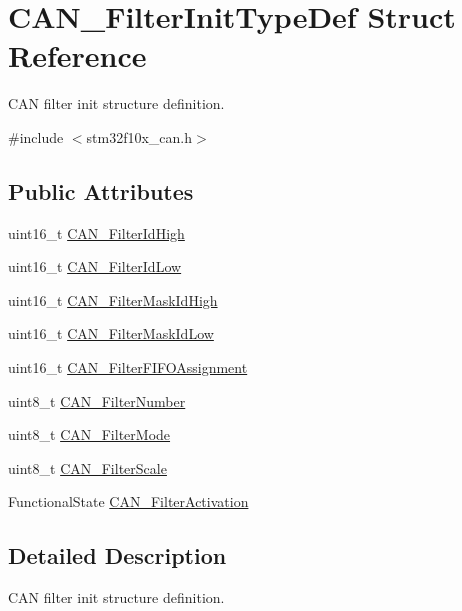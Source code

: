 \hypertarget{structCAN__FilterInitTypeDef}{
\section{CAN\_\-FilterInitTypeDef Struct Reference}
\label{structCAN__FilterInitTypeDef}
}


CAN filter init structure definition.  




{\ttfamily \#include $<$stm32f10x\_\-can.h$>$}

\subsection*{Public Attributes}
\begin{DoxyCompactItemize}
\item 
uint16\_\-t \hyperlink{structCAN__FilterInitTypeDef_afc109aa8eedced09d296605f2eb871f7}{CAN\_\-FilterIdHigh}
\item 
uint16\_\-t \hyperlink{structCAN__FilterInitTypeDef_ab8c56b48ac323e8c7a1b535c79a51f87}{CAN\_\-FilterIdLow}
\item 
uint16\_\-t \hyperlink{structCAN__FilterInitTypeDef_a6f34539615e6484f266b46aa8f362a91}{CAN\_\-FilterMaskIdHigh}
\item 
uint16\_\-t \hyperlink{structCAN__FilterInitTypeDef_a0f052daf04b0a481ecfa5c2cc8058089}{CAN\_\-FilterMaskIdLow}
\item 
uint16\_\-t \hyperlink{structCAN__FilterInitTypeDef_a01ba491f12097adcc9f0a3d627628d55}{CAN\_\-FilterFIFOAssignment}
\item 
uint8\_\-t \hyperlink{structCAN__FilterInitTypeDef_af94466e1138c2b4fe6a67cf556981193}{CAN\_\-FilterNumber}
\item 
uint8\_\-t \hyperlink{structCAN__FilterInitTypeDef_a7cfb23c48aad13a058c2619dbc062d8a}{CAN\_\-FilterMode}
\item 
uint8\_\-t \hyperlink{structCAN__FilterInitTypeDef_a9d52661aca538dbfcafdda6f16dddc82}{CAN\_\-FilterScale}
\item 
FunctionalState \hyperlink{structCAN__FilterInitTypeDef_a0225afda33b565f358ca75bdaa780074}{CAN\_\-FilterActivation}
\end{DoxyCompactItemize}


\subsection{Detailed Description}
CAN filter init structure definition. 

